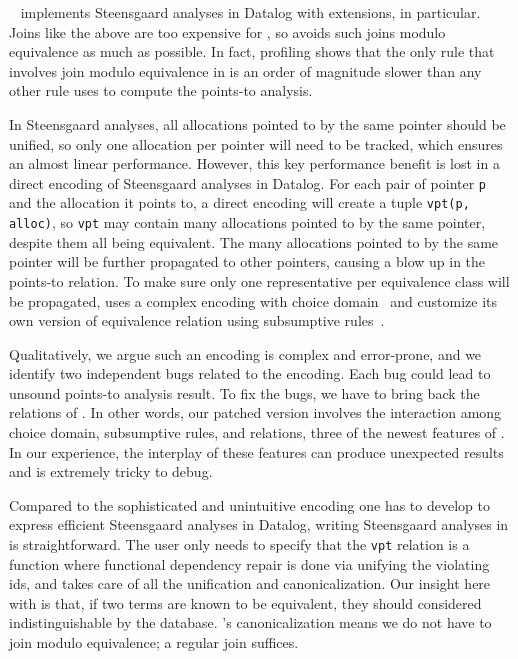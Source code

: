 \cclyzerpp~\citep{cclyzerpp,cclyzer} implements Steensgaard analyses in Datalog with extensions,
 \souffle in particular.
Joins like the above are too expensive for \cclyzerpp, 
 so \cclyzerpp avoids such joins modulo equivalence as much as possible.
In fact, 
 profiling shows that 
 the only rule that involves join modulo equivalence in \cclyzerpp
 is an order of magnitude slower 
 than any other rule \cclyzerpp uses to compute the points-to analysis.

In Steensgaard analyses, 
 all allocations pointed to by the same pointer should be unified,
 so only one allocation per pointer will need to be tracked,
 which ensures an almost linear performance.
However,
 this key performance benefit 
 is lost in a direct encoding of Steensgaard analyses
 in Datalog.
For each pair of pointer \lstinline[language=Souffle]{p} 
 and the allocation it points to,
 a direct encoding will create a tuple \lstinline[language=Souffle]{vpt(p, alloc)},
 so \lstinline[language=Souffle]{vpt} may contain many allocations pointed to 
 by the same pointer, despite them all being equivalent.
The many allocations pointed to by the same pointer
 will be further propagated to other pointers,
 causing a blow up in the points-to relation.
To make sure only 
 one representative per equivalence class will be 
 propagated, \cclyzerpp uses a complex encoding
 with choice domain~\citep{choice-datalog, choice-souffle}
 and customize its own version of equivalence relation using 
 subsumptive rules~\citep{datalog-subsumption}.

Qualitatively, 
 we argue such an encoding is complex and error-prone,
 and we identify two independent bugs 
 related to the \cclyzerpp encoding.
Each bug could lead to unsound points-to analysis result.
To fix the bugs, 
 we have to bring back the \eqrel relations of \souffle.
In other words, our patched version involves 
 the interaction among choice domain, subsumptive rules, 
 and \eqrel relations, three of the newest features of \souffle.
In our experience,
 the interplay of these features can produce unexpected results
 and is extremely tricky to debug.

Compared to the sophisticated and unintuitive encoding 
 one has to develop to express efficient Steensgaard analyses
 in Datalog,
 writing Steensgaard analyses in \egglog is straightforward.
The user only needs to specify that the \lstinline[language=Souffle]{vpt} relation is 
 a function where functional dependency repair is done via 
 unifying the violating ids,
 and \egglog takes care of 
 all the unification and canonicalization.
Our insight here with \egglog is that,
 if two terms are known to be equivalent,
 they should considered indistinguishable by
 the database. 
\Egglog's canonicalization
 means we do not have to join modulo equivalence;
 a regular join suffices.

